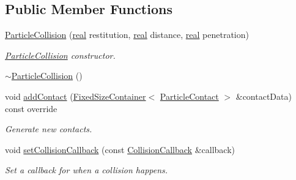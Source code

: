 \subsection*{Public Member Functions}
\begin{DoxyCompactItemize}
\item 
\mbox{\hyperlink{classr3_1_1_particle_collision_af3c52ed10e7495207bf20f3263175098}{Particle\+Collision}} (\mbox{\hyperlink{namespacer3_ab2016b3e3f743fb735afce242f0dc1eb}{real}} restitution, \mbox{\hyperlink{namespacer3_ab2016b3e3f743fb735afce242f0dc1eb}{real}} distance, \mbox{\hyperlink{namespacer3_ab2016b3e3f743fb735afce242f0dc1eb}{real}} penetration)
\begin{DoxyCompactList}\small\item\em \mbox{\hyperlink{classr3_1_1_particle_collision}{Particle\+Collision}} constructor. \end{DoxyCompactList}\item 
\mbox{\hyperlink{classr3_1_1_particle_collision_a7227b004e41a96aafd5f9a54e3b6b97e}{$\sim$\+Particle\+Collision}} ()
\item 
void \mbox{\hyperlink{classr3_1_1_particle_collision_adb77c85cb90707073e7c654acb2e6719}{add\+Contact}} (\mbox{\hyperlink{classr3_1_1_fixed_size_container}{Fixed\+Size\+Container}}$<$ \mbox{\hyperlink{classr3_1_1_particle_contact}{Particle\+Contact}} $>$ \&contact\+Data) const override
\begin{DoxyCompactList}\small\item\em Generate new contacts. \end{DoxyCompactList}\item 
void \mbox{\hyperlink{classr3_1_1_particle_collision_ada3299069d9e5436a6839c70fdd0c820}{set\+Collision\+Callback}} (const \mbox{\hyperlink{classr3_1_1_particle_collision_a85d1a02ec35335322e5a3ce47f0e46cf}{Collision\+Callback}} \&callback)
\begin{DoxyCompactList}\small\item\em Set a callback for when a collision happens. \end{DoxyCompactList}\end{DoxyCompactItemize}
